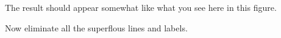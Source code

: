 \documentclass{tufte-handout}
\newcommand{\uv}{\vspace{.1in}}
\newcommand{\uvx}{\vspace{.2in}}
\begin{document}
\begin{tcolorbox}
\uvx
\begin{minipage}{0.5\textwidth}
\end{minipage} \hfill
\begin{minipage}{0.45\textwidth}
\begin{scriptsize}

\uv
The result should appear somewhat like what you see here in this figure. 

\uv Now eliminate all the superflous lines and labels. 




\end{scriptsize}
\end{minipage}


\end{tcolorbox}
\end{document}
